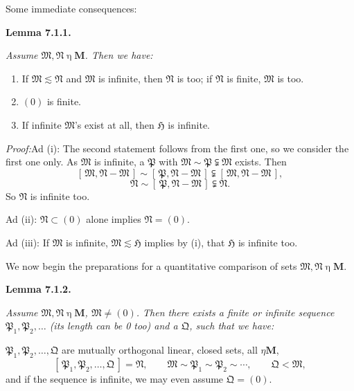 \documentclass[12pt,b5paper,twoside]{article}
\newcommand{\Hspace}{\mathfrak H}
\newcommand{\M}{\mathbf M}
\newcommand{\clos}[1]{[\,#1\,]}
\newcommand{\Lemma}[1]{%
  \par\smallskip\noindent\phantomsection\label{lem:#1}\textbf{Lemma #1.}\enspace
}
\newcommand{\Proof}{\par\noindent\textit{Proof:}\enspace}
\begin{document}
Some immediate consequences:

\Lemma{7.1.1} {\itshape
Assume \(\mathfrak M,\mathfrak N\mathbin{\eta}\M\). Then we have:
\begin{enumerate}[label=(\roman*)]
 \item If \(\mathfrak M\lesssim\mathfrak N\) and \(\mathfrak M\) is
   infinite, then \(\mathfrak N\) is too; if \(\mathfrak N\) is finite,
   \(\mathfrak M\) is too.
 \item \((0)\) is finite.
 \item If infinite \(\mathfrak M\)'s exist at all, then \(\Hspace\) is
   infinite.
\end{enumerate}
}

\Proof Ad (i): The second statement follows from the first one, so we
consider the first one only. As \(\mathfrak M\) is infinite, a
\(\mathfrak P\) with \(\mathfrak M\sim\mathfrak P\subsetneqq\mathfrak M\)
exists. Then
\[
 \clos{\mathfrak M,\mathfrak N-\mathfrak M}
 \sim
 \clos{\mathfrak P,\mathfrak N-\mathfrak M}
 \subsetneqq
 \clos{\mathfrak M,\mathfrak N-\mathfrak M},
\]
\[
 \mathfrak N\sim\clos{\mathfrak P,\mathfrak N-\mathfrak M}
 \subsetneqq\mathfrak N.
\]
So \(\mathfrak N\) is infinite too.

Ad (ii): \(\mathfrak N\subset(0)\) alone implies
\(\mathfrak N=(0)\).

Ad (iii): If \(\mathfrak M\) is infinite,
\(\mathfrak M\lesssim\Hspace\) implies by (i), that \(\Hspace\) is infinite
too.

We now begin the preparations for a quantitative comparison of sets
\(\mathfrak M,\mathfrak N\mathbin{\eta}\M\).

\Lemma{7.1.2} {\itshape
Assume \(\mathfrak M,\mathfrak N\mathbin{\eta}\M\),
\(\mathfrak M\ne(0)\). Then there exists a finite or infinite sequence
\(\mathfrak P_1,\mathfrak P_2,\ldots\) (its length can be 0 too) and a
\(\mathfrak Q\), such that we have:

\(\mathfrak P_1,\mathfrak P_2,\ldots,\mathfrak Q\) are mutually orthogonal
linear, closed sets, all \(\mathbin{\eta}\M\),
\[
 \clos{\mathfrak P_1,\mathfrak P_2,\ldots,\mathfrak Q}=\mathfrak N,
 \qquad
 \mathfrak M\sim\mathfrak P_1\sim\mathfrak P_2\sim\cdots,
 \qquad
 \mathfrak Q<\mathfrak M,
\]
and if the sequence is infinite, we may even assume \(\mathfrak Q=(0)\).
}
\end{document}

